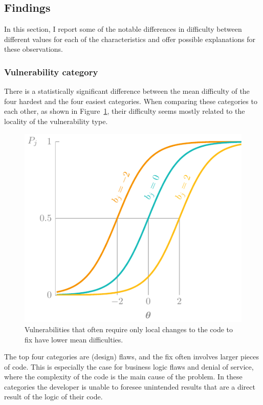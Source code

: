 \subsection{Findings}
In this section, I report some of the notable differences in difficulty between different values for each of the characteristics and offer possible explanations for these observations.

\subsubsection{Vulnerability category}
There is a statistically significant difference between the mean difficulty of the four hardest and the four easiest categories.
When comparing these categories to each other, as shown in Figure~\ref{fig:cats1}, their difficulty seems mostly related to the locality of the vulnerability type.

\begin{figure}
    \centering
    \includegraphics[page=20]{03-education/figures/tikzfigures.pdf}
    \caption[Difficulty of bugs versus flaws]{Vulnerabilities that often require only local changes to the code to fix have lower mean difficulties.}
    \label{fig:cats1}
\end{figure}

The top four categories are (design) \glspl{flaw}, and the fix often involves larger pieces of code.
This is especially the case for business logic flaws and denial of service, where the complexity of the code is the main cause of the problem.
In these categories the developer is unable to foresee unintended results that are a direct result of the logic of their code.

